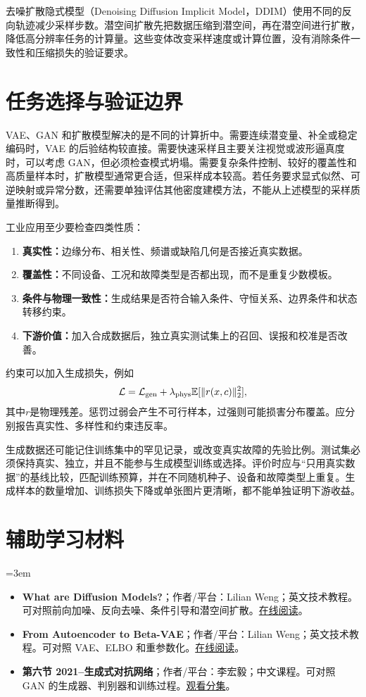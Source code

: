 去噪扩散隐式模型（Denoising Diffusion Implicit Model，DDIM）使用不同的反向轨迹减少采样步数。潜空间扩散先把数据压缩到潜空间，再在潜空间进行扩散，降低高分辨率任务的计算量。这些变体改变采样速度或计算位置，没有消除条件一致性和压缩损失的验证要求。

\section{任务选择与验证边界}

VAE、GAN 和扩散模型解决的是不同的计算折中。需要连续潜变量、补全或稳定编码时，VAE 的后验结构较直接。需要快速采样且主要关注视觉或波形逼真度时，可以考虑 GAN，但必须检查模式坍塌。需要复杂条件控制、较好的覆盖性和高质量样本时，扩散模型通常更合适，但采样成本较高。若任务要求显式似然、可逆映射或异常分数，还需要单独评估其他密度建模方法，不能从上述模型的采样质量推断得到。

工业应用至少要检查四类性质：
\begin{enumerate}
  \item \textbf{真实性：}边缘分布、相关性、频谱或缺陷几何是否接近真实数据。
  \item \textbf{覆盖性：}不同设备、工况和故障类型是否都出现，而不是重复少数模板。
  \item \textbf{条件与物理一致性：}生成结果是否符合输入条件、守恒关系、边界条件和状态转移约束。
  \item \textbf{下游价值：}加入合成数据后，独立真实测试集上的召回、误报和校准是否改善。
\end{enumerate}

约束可以加入生成损失，例如
\begin{equation}
\mathcal L=\mathcal L_{\mathrm{gen}}+\lambda_{\mathrm{phys}}\mathbb{E}[\|r(x,c)\|_2^2],
\end{equation}
其中$r$是物理残差。惩罚过弱会产生不可行样本，过强则可能损害分布覆盖。应分别报告真实性、多样性和约束违反率。

生成数据还可能记住训练集中的罕见记录，或改变真实故障的先验比例。测试集必须保持真实、独立，并且不能参与生成模型训练或选择。评价时应与“只用真实数据”的基线比较，匹配训练预算，并在不同随机种子、设备和故障类型上重复。生成样本的数量增加、训练损失下降或单张图片更清晰，都不能单独证明下游收益。

\section*{辅助学习材料}
\begingroup
\emergencystretch=3em
\begin{itemize}
\item \textbf{What are Diffusion Models?}；作者/平台：Lilian Weng；英文技术教程。可对照前向加噪、反向去噪、条件引导和潜空间扩散。\href{https://lilianweng.github.io/posts/2021-07-11-diffusion-models/}{在线阅读}。
\item \textbf{From Autoencoder to Beta-VAE}；作者/平台：Lilian Weng；英文技术教程。可对照 VAE、ELBO 和重参数化。\href{https://lilianweng.github.io/posts/2018-08-12-vae/}{在线阅读}。
\item \textbf{第六节 2021--生成式对抗网络}；作者/平台：李宏毅；中文课程。可对照 GAN 的生成器、判别器和训练过程。\href{https://www.bilibili.com/video/BV1Wv411h7kN/?p=58}{观看分集}。
\end{itemize}
\endgroup

